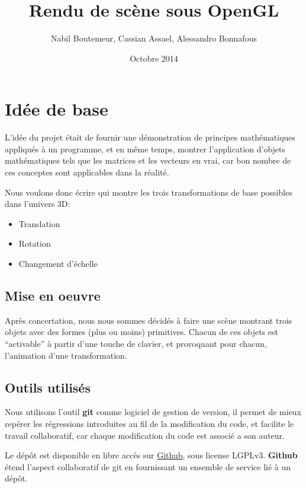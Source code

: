 \documentclass[11pt, a4paper, titlepage]{article}
\begin{document}
\title{Rendu de scène sous OpenGL}
\author{Nabil Boutemeur, Cassian Assael, Alessandro Bonnafous}
\date{Octobre 2014}
\maketitle

\tableofcontents
\pagebreak

\section{Idée de base}
L'idée du projet était de fournir une démonstration de principes mathématiques appliqués
à un programme, et en même temps, montrer l'application d'objets mathématiques tels que les
matrices et les vecteurs en vrai, car bon nombre de ces conceptes sont applicables dans la réalité.

Nous voulons donc écrire qui montre les trois transformations de base possibles dans l'univers 3D:
\begin{itemize}
\item Translation
\item Rotation
\item Changement d'échelle
\end{itemize}
\subsection{Mise en oeuvre}

Après concertation, nous nous sommes décidés à faire une scène montrant trois objets avec des formes (plus ou moins) primitives.
Chacun de ces objets est ``activable'' à partir d'une touche de clavier, et provoquant pour chacun, l'animation d'une transformation.
\pagebreak

\subsection{Outils utilisés}

Nous utilisons l'outil \textbf{git} comme logiciel de gestion de version, il permet de mieux repérer les régressions introduites au fil
de la modification du code, et facilite le travail collaboratif, car chaque modification du code est associé a son auteur.

Le dépôt est disponible en libre accès sur \href{https://github.com/nbouteme/OpenGL-Demo}{{\color{blue}Github}}, sous license LGPLv3.
\textbf{Github} étend l'aspect collaboratif de git en fournissant un ensemble de service lié à un dépôt.
\end{document}
